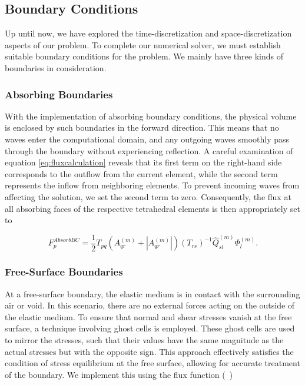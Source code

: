 \subsection{Boundary Conditions}
Up until now, we have explored the time-discretization and space-discretization aspects of our problem. To complete our numerical
solver, we must establish suitable boundary conditions for the problem. We mainly have three kinds of boundaries in consideration.

\subsubsection{Absorbing Boundaries}
With the implementation of absorbing boundary conditions, the physical volume is enclosed by such boundaries in the forward direction.
This means that no waves enter the computational domain, and any outgoing waves smoothly pass through the boundary without experiencing
reflection. A careful examination of equation \ref{eq:fluxcalculation} reveals that its first term on the right-hand side corresponds
to the outflow from the current element, while the second term represents the inflow from neighboring elements. To prevent incoming
waves from affecting the solution, we set the second term to zero. Consequently, the flux at all absorbing faces of the respective
tetrahedral elements is then appropriately set to

\begin{equation}
    F_p^{AbsorbBC} = \frac{1}{2} T_{pq} \left(A_{qr}^{\left(m\right)} + \left|A_{qr}^{\left(m\right)}\right|\right) \left(T_{rs}\right)^{-1} \hat{Q}_{sl}^{\left(m\right)} \Phi_l^{\left(m\right)}.
\end{equation}

\subsubsection{Free-Surface Boundaries}
At a free-surface boundary, the elastic medium is in contact with the surrounding air or void. In this scenario, there are no external forces
acting on the outside of the elastic medium. To ensure that normal and shear stresses vanish at the free surface, a technique involving
ghost cells is employed. These ghost cells are used to mirror the stresses, such that their values have the same magnitude as the actual
stresses but with the opposite sign. This approach effectively satisfies the condition of stress equilibrium at the free surface, allowing
for accurate treatment of the boundary. We implement this using the flux function (~\parencite{dumbser1})

